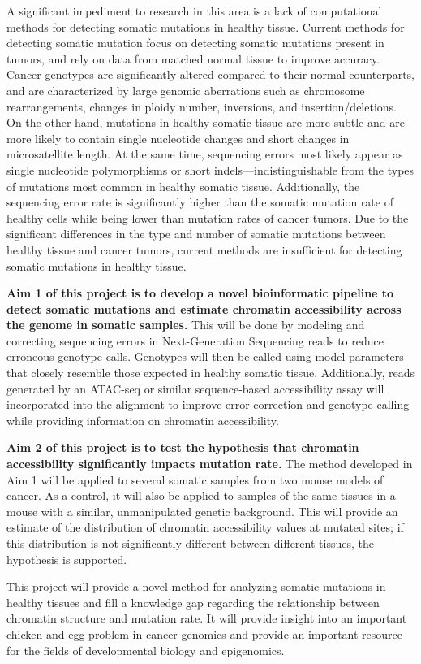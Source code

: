 A significant impediment to research in this area is a lack of computational methods for detecting somatic mutations in healthy tissue.
Current methods for detecting somatic mutation focus on detecting somatic mutations present in tumors, and rely on data from matched normal tissue to improve accuracy.
Cancer genotypes are significantly altered compared to their normal counterparts, and are characterized by large genomic aberrations such as chromosome rearrangements, changes in ploidy number, inversions, and insertion/deletions.
On the other hand, mutations in healthy somatic tissue are more subtle and are more likely to contain single nucleotide changes and short changes in microsatellite length.
At the same time, sequencing errors most likely appear as single nucleotide polymorphisms or short indels---indistinguishable from the types of mutations most common in healthy somatic tissue.
Additionally, the sequencing error rate is significantly higher than the somatic mutation rate of healthy cells while being lower than mutation rates of cancer tumors.
Due to the significant differences in the type and number of somatic mutations between healthy tissue and cancer tumors, current methods are insufficient for detecting somatic mutations in healthy tissue.

\textbf{Aim 1 of this project is to develop a novel bioinformatic pipeline to detect somatic mutations and estimate chromatin accessibility across the genome in somatic samples.}
This will be done by modeling and correcting sequencing errors in Next-Generation Sequencing reads to reduce erroneous genotype calls. Genotypes will then be called using model parameters that closely resemble those expected in healthy somatic tissue.
Additionally, reads generated by an ATAC-seq or similar sequence-based accessibility assay will incorporated into the alignment to improve error correction and genotype calling while providing information on chromatin accessibility.

\textbf{Aim 2 of this project is to test the hypothesis that chromatin accessibility significantly impacts mutation rate.}
The method developed in Aim 1 will be applied to several somatic samples from two mouse models of cancer.
As a control, it will also be applied to samples of the same tissues in a mouse with a similar, unmanipulated genetic background.
This will provide an estimate of the distribution of chromatin accessibility values at mutated sites; if this distribution is not significantly different between different tissues, the hypothesis is supported.

This project will provide a novel method for analyzing somatic mutations in healthy tissues and fill a knowledge gap regarding the relationship between chromatin structure and mutation rate. It will provide insight into an important chicken-and-egg problem in cancer genomics and provide an important resource for the fields of developmental biology and epigenomics.
